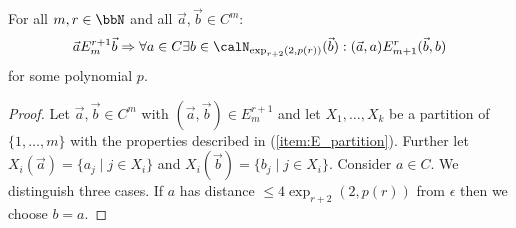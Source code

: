 \begin{lemma}\label{lem:EF_relations}
	For all $m,r\in\bbN$ and all $\vec{a},\vec{b}\in C^m$:  
	\[\vec{a} E^{r+1}_m \vec{b} \Rightarrow \forall a\in C \exists b\in \calN_{\exp_{r+2}(2,p(r))}(\vec{b}): (\vec{a}, a) E^{r}_{m+1} (\vec{b}, b)\]
	for some polynomial $p$.
\end{lemma}
\begin{proof}
	Let $\vec{a}, \vec{b} \in C^m$ with $(\vec{a}, \vec{b}) \in E^{r+1}_m$ and 
	let $X_1,\ldots,X_k$ be a partition of $\{1,\ldots,m\}$ with the properties described in (\ref{item:E_partition}). Further let $X_i(\vec{a}) = \{a_j \mid j\in X_i \}$ and $X_i(\vec{b}) = \{b_j \mid j\in X_i \}$. Consider $a\in C$. We distinguish three cases.
	If $a$ has distance $\leq 4\exp_{r+2}(2, p(r))$ from $\epsilon$ then we choose $b=a$.
	

\end{proof}
